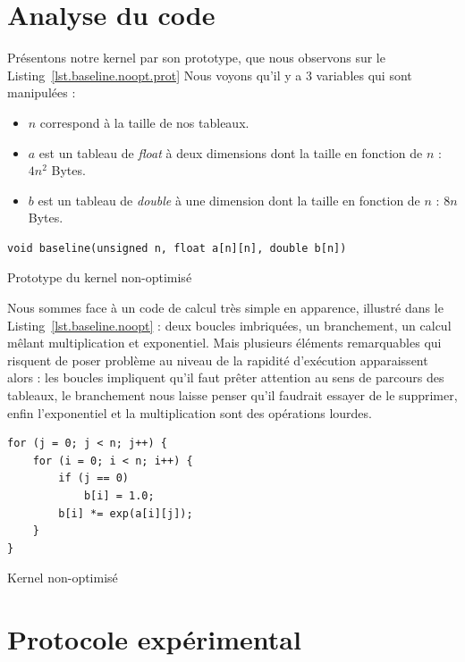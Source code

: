 \documentclass[12pt,a4paper]{article}
\begin{document}
\section{Analyse du code}

Présentons notre kernel par son prototype, que nous observons sur le
Listing~\ref{lst.baseline.noopt.prot} Nous voyons qu’il y a 3 variables qui sont manipulées :
\begin{itemize}
    \item $n$ correspond à la taille de nos tableaux.
    \item $a$ est un tableau de \textit{float} à deux dimensions dont la taille
        en fonction de $n$ : $4n^2$ Bytes.
    \item $b$ est un tableau de \textit{double} à une dimension dont la taille
        en fonction de $n$ : $8n$ Bytes.
\end{itemize}

\begin{listing}[h]
    \begin{verbatim}
void baseline(unsigned n, float a[n][n], double b[n])
    \end{verbatim}
    \caption{Prototype du kernel non-optimisé}
    \label{lst.baseline.noopt.prot}
\end{listing}

Nous sommes face à un code de calcul très simple en apparence, illustré dans le
Listing~\ref{lst.baseline.noopt} : deux boucles imbriquées, un branchement, un
calcul mêlant multiplication et exponentiel. Mais plusieurs éléments remarquables qui
risquent de poser problème au niveau de la rapidité d'exécution apparaissent
alors : les boucles impliquent qu'il faut prêter attention au sens de parcours
des tableaux, le branchement nous laisse penser qu'il faudrait essayer de le
supprimer, enfin l'exponentiel et la multiplication sont des opérations lourdes.

\begin{listing}[h]
    \begin{verbatim}
for (j = 0; j < n; j++) {
    for (i = 0; i < n; i++) {
        if (j == 0)
            b[i] = 1.0;
        b[i] *= exp(a[i][j]);
    }
}
    \end{verbatim}
    \caption{Kernel non-optimisé}
    \label{lst.baseline.noopt}
\end{listing}

\section{Protocole expérimental}
\end{document}
